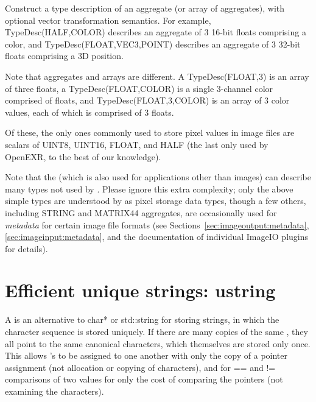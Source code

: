 Construct a type description of an aggregate (or array of aggregates),
with optional vector transformation semantics.  For example, 
{\cf TypeDesc(HALF,COLOR)} describes an aggregate of 3 16-bit floats
comprising a color, and {\cf TypeDesc(FLOAT,VEC3,POINT)} describes 
an aggregate of 3 32-bit floats comprising a 3D position.

Note that aggregates and arrays are different.  A {\cf
  TypeDesc(FLOAT,3)} is an array of three floats, a {\cf
  TypeDesc(FLOAT,COLOR)} is a single 3-channel color comprised of
floats, and {\cf TypeDesc(FLOAT,3,COLOR)} is an array of 3 color values,
each of which is comprised of 3 floats.
\apiend

\bigskip

Of these, the only ones commonly used to store pixel values in image files
are scalars of {\cf UINT8}, {\cf UINT16}, {\cf FLOAT}, and {\cf HALF}
(the last only used by OpenEXR, to the best of our knowledge).

Note that the \TypeDesc (which is also used for applications other
than images) can describe many types not used by
\product.  Please ignore this extra complexity; only the above simple types are understood by
\product as pixel storage data types, though a few others, including
{\cf STRING} and {\cf MATRIX44} aggregates, are occasionally used for
\emph{metadata} for certain image file formats (see
Sections~\ref{sec:imageoutput:metadata}, \ref{sec:imageinput:metadata},
and the documentation of individual ImageIO plugins for details).


\section{Efficient unique strings: {\cf ustring}}
\label{sec:ustring}

A \ustring is an alternative to {\cf char*} or {\cf std::string} for storing
strings, in which the character sequence is stored uniquely.  If there are
many copies of the same \ustring, they all point to the same canonical
characters, which themselves are stored only once. This allows \ustring's to
be assigned to one another with only the copy of a pointer assignment (not
allocation or copying of characters), and for {\cf ==} and {\cf !=}
comparisons of two \ustring values for only the cost of comparing the
pointers (not examining the characters).

